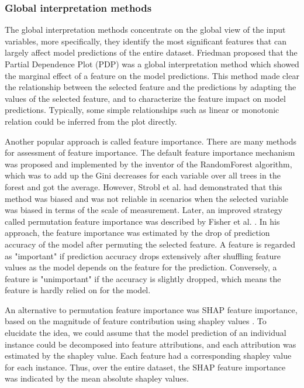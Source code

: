 \subsubsection{Global interpretation methods}

The global interpretation methods concentrate on the global view of the input variables, more specifically, they identify the most significant features that can largely affect model predictions of the entire dataset. Friedman proposed that the Partial Dependence Plot (PDP) was a global interpretation method which showed the marginal effect of a feature on the model predictions\cite{friedman2001greedy}. This method made clear the relationship between the selected feature and the predictions by adapting the values of the selected feature, and to characterize the feature impact on model predictions. Typically, some simple relationships such as linear or monotonic relation could be inferred from the plot directly. 

Another popular approach is called feature importance. There are many methods for assessment of feature importance. The default feature importance mechanism was proposed and implemented by the inventor of the RandomForest algorithm, which was to add up the Gini decreases for each variable over all trees in the forest and got the average. However, Strobl et al. had demonstrated that this method was biased and was not reliable in scenarios when the selected variable was biased in terms of the scale of measurement\cite{strobl2007bias}. Later, an improved strategy called permutation feature importance was described by Fisher et al. \cite{fisher2018model}. In his approach, the feature importance was estimated by the drop of prediction accuracy of the model after permuting the selected feature. A feature is regarded as "important" if prediction accuracy drops extensively after shuffling feature values as the model depends on the feature for the prediction. Conversely, a feature is "unimportant" if the accuracy is slightly dropped, which means the feature is hardly relied on for the model.

An alternative to permutation feature importance was SHAP feature importance, based on the magnitude of feature contribution using shapley values \cite{molnar2019}. To elucidate the idea, we could assume that the model prediction of an individual instance could be decomposed into feature attributions, and each attribution was estimated by the shapley value. Each feature had a corresponding shapley value for each instance. Thus, over the entire dataset, the SHAP feature importance was indicated by the mean absolute shapley values. 

